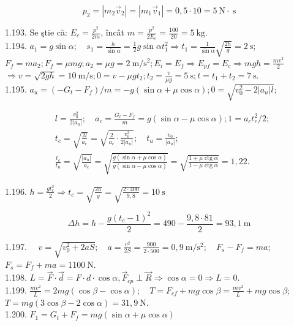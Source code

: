 $$
p_{2}=\left|m_{2} \vec{v}_{2}\right|=\left|m_{1} \vec{v}_{1}\right|=0,5 \cdot 10=5 \mathrm{~N} \cdot \mathrm{~s}
$$

1.193. Se ştie că: $E_{c}=\frac{p^{2}}{2 m}$, încât $m=\frac{p^{2}}{2 E_{c}}=\frac{100}{20}=5 \mathrm{~kg}$.\\
1.194. $a_{1}=g \sin \alpha ; \quad s_{1}=\frac{h}{\sin \alpha}=\frac{1}{2} g \sin \alpha t_{1}^{2} \Rightarrow t_{1}=\frac{1}{\sin \alpha} \sqrt{\frac{2 h}{g}}=2 \mathrm{~s}$;\\
$F_{f}=m a_{2} ; F_{f}=\mu m g ; a_{2}=\mu g=2 \mathrm{~m} / \mathrm{s}^{2} ; E_{i}=E_{f} \Rightarrow E_{p f}=E_{c} \Rightarrow m g h=\frac{m v^{2}}{2}$\\
$\Rightarrow v=\sqrt{2 g h}=10 \mathrm{~m} / \mathrm{s} ; 0=v-\mu g t_{2} ; t_{2}=\frac{v}{\mu g}=5 \mathrm{~s} ; t=t_{1}+t_{2}=7 \mathrm{~s}$.\\
1.195. $a_{u}=\left(-G_{t}-F_{f}\right) / m=-g(\sin \alpha+\mu \cos \alpha) ; 0=\sqrt{v_{0}^{2}-2\left|a_{u}\right| l}$;

$$
\begin{aligned}
& l=\frac{v_{0}^{2}}{2\left|a_{u}\right|} ; \quad a_{c}=\frac{G_{t}-F_{f}}{m}=g(\sin \alpha-\mu \cos \alpha) ; 1=a_{c} t_{c}^{2} / 2 ; \\
& t_{c}=\sqrt{\frac{2 l}{a_{c}}}=\sqrt{\frac{2}{a_{c}} \cdot \frac{v_{0}^{2}}{2\left|a_{u}\right|}} ; \quad t_{u}=\frac{v_{0}}{\left|a_{u}\right|} ; \\
& \frac{t_{c}}{t_{u}}=\sqrt{\frac{\left|a_{u}\right|}{a_{c}}}=\sqrt{\frac{g(\sin \alpha+\mu \cos \alpha)}{g(\sin \alpha-\mu \cos \alpha)}}=\sqrt{\frac{1+\mu \operatorname{ctg} \alpha}{1-\mu \operatorname{ctg} \alpha}}=1,22 .
\end{aligned}
$$

1.196. $h=\frac{g t_{c}^{2}}{2} \Rightarrow t_{c}=\sqrt{\frac{2 h}{g}}=\sqrt{\frac{2 \cdot 400}{9,8}}=10 \mathrm{~s}$

$$
\Delta h=h-\frac{g\left(t_{c}-1\right)^{2}}{2}=490-\frac{9,8 \cdot 81}{2}=93,1 \mathrm{~m}
$$

1.197. $\quad v=\sqrt{v_{0}^{2}+2 a S} ; \quad a=\frac{v^{2}}{2 S}=\frac{900}{2 \cdot 500}=0,9 \mathrm{~m} / \mathrm{s}^{2} ; \quad F_{s}-F_{f}=m a$; $F_{s}=F_{f}+m a=1100 \mathrm{~N}$.\\
1.198. $L=\vec{F} \cdot \vec{d}=F \cdot d \cdot \cos \alpha, \vec{F}_{c p} \perp \vec{R} \Rightarrow \cos \alpha=0 \Rightarrow L=0$.\\
1.199. $\frac{m v^{2}}{L}=2 m g(\cos \beta-\cos \alpha) ; \quad T=F_{c f}+m g \cos \beta=\frac{m v^{2}}{L}+m g \cos \beta ;$ $T=m g(3 \cos \beta-2 \cos \alpha)=31,9 \mathrm{~N}$.\\
1.200. $F_{1}=G_{t}+F_{f}=m g(\sin \alpha+\mu \cos \alpha)$


